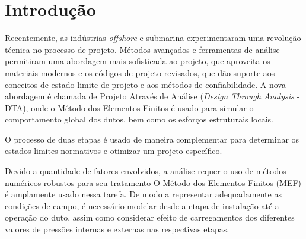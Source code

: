 \section{Introdução}

Recentemente, as indústrias \textit{offshore} e submarina experimentaram uma revolução técnica no processo de projeto.
Métodos avançados e ferramentas de análise permitiram uma abordagem mais sofisticada ao projeto, que aproveita os materiais modernos e os códigos de projeto revisados, que dão suporte aos conceitos de estado limite de projeto e aos métodos de confiabilidade.
A nova abordagem é chamada de Projeto Através de Análise (\textit{Design Through Analysis} - DTA), onde o Método dos Elementos Finitos é usado para simular o comportamento global dos dutos, bem como os esforços estruturais locais.

O processo de duas etapas é usado de maneira complementar para determinar os estados limites normativos e otimizar um projeto específico.

Devido a quantidade de fatores envolvidos, a análise requer o uso de métodos numéricos robustos para seu tratamento
O Método dos Elementos Finitos (MEF) é amplamente usado nessa tarefa.
De modo a representar adequadamente as condições de campo, é necessário modelar desde a etapa de instalação até a operação do duto, assim como considerar efeito de carregamentos dos diferentes valores de pressões internas e externas nas respectivas etapas.